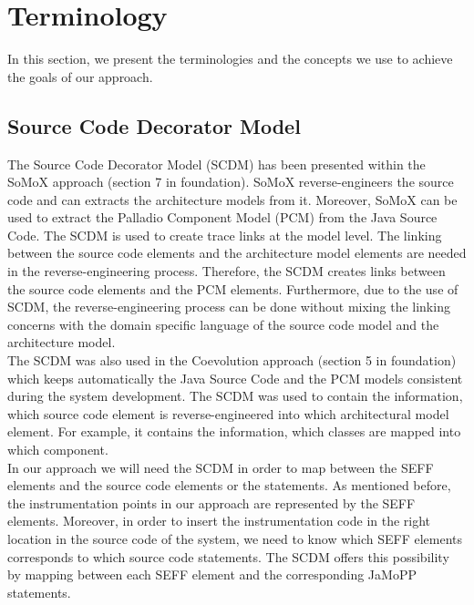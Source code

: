 \section{Terminology}
\label{sec:Terminology}
In this section, we present the terminologies and the concepts we use to achieve the goals of our approach. 

\subsection{Source Code Decorator Model}
\label{sec:Source Code Decorator Model}

The Source Code Decorator Model (SCDM) has been presented within the SoMoX approach (section 7 in foundation).  SoMoX reverse-engineers the source code and can extracts the architecture models from it. Moreover, SoMoX can be used to extract the Palladio Component Model (PCM) from the Java Source Code. The SCDM is used to create trace links at the model level. The linking between the source code elements and the architecture model elements are needed in the reverse-engineering process. Therefore, the SCDM creates links between the source code elements and the PCM elements. Furthermore, due to the use of SCDM, the reverse-engineering process can be done without mixing the linking concerns with the domain specific language of the source code model and the architecture model.\\

The SCDM was also used in the Coevolution approach (section 5 in foundation) which keeps automatically the Java Source Code and the PCM models consistent during the system development. The SCDM was used to contain the information, which source code element is reverse-engineered into which architectural model element. For example, it contains the information, which classes are mapped into which component.\\

In our approach we will need the SCDM in order to map between the SEFF elements and the source code elements or the statements. As mentioned before, the instrumentation points in our approach are represented by the SEFF elements. Moreover, in order to insert the instrumentation code in the right location in the source code of the system, we need to know which SEFF elements corresponds to which source code statements. The SCDM offers this possibility by mapping between each SEFF element and the corresponding JaMoPP statements. \\

